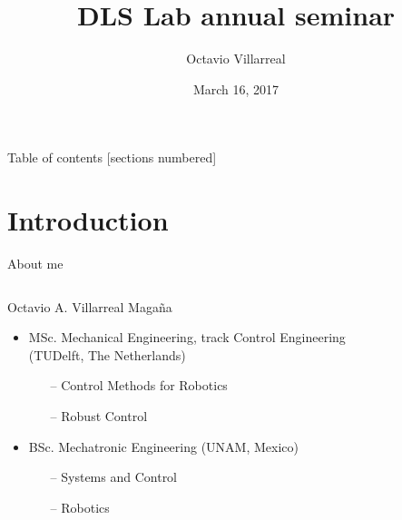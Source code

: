 \documentclass[10pt]{beamer}
\title{DLS Lab annual seminar}
\subtitle{}
\date{March 16, 2017}
\author{Octavio Villarreal}
\institute{Istituto Italiano di Tecnologia}
\begin{document}
\maketitle

\begin{frame}{Table of contents}
  [sections numbered]
  \tableofcontents[hideallsubsections]
\end{frame}

\section{Introduction}
\begin{frame}{About me}
	\begin{columns}
		\begin{column}{0.6\textwidth}
		Octavio A. Villarreal Maga\~na
		\\
			\begin{itemize}\setlength\itemsep{2.5em}
				\item MSc. Mechanical Engineering, track Control Engineering (TUDelft, The Netherlands)
				\begin{itemize}\setlength\itemsep{1em}
					\item [--] Control Methods for Robotics
					\item [--] Robust Control
				\end{itemize}
				\item BSc. Mechatronic Engineering (UNAM, Mexico)
				\begin{itemize}\setlength\itemsep{1em}
					\item [--] Systems and Control
					\item [--] Robotics
				\end{itemize}
			\end{itemize}
		\end{column}
		\begin{column}{0.4\textwidth}
			\begin{figure}[ht]
				\vspace{-59.3pt}

\end{figure}
\end{column}
\end{columns}
\end{frame}
\end{document}
